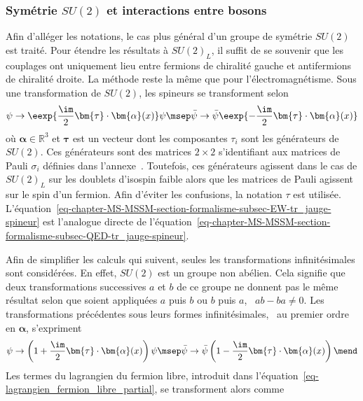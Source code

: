 \subsubsection{Symétrie $SU(2)$ et interactions entre bosons}\label{chapter-MS-MSSM-section-formalisme-subsec-EW-SU2_general}
Afin d'alléger les notations, le cas plus général d'un groupe de symétrie $SU(2)$ est traité. Pour étendre les résultats à $SU(2)_L$, il suffit de se souvenir que les couplages ont uniquement lieu entre fermions de chiralité gauche et antifermions de chiralité droite.
La méthode reste la même que pour l'électromagnétisme.
Sous une transformation de $SU(2)$, les spineurs se transforment selon
\begin{equation}
\psi \to \eexp{\frac{\im}{2}\bm{\tau}\cdot\bm{\alpha}(x)}\psi
\msep
\bar{\psi} \to \bar{\psi}\eexp{-\frac{\im}{2}\bm{\tau}\cdot\bm{\alpha}(x)}
\label{eq-chapter-MS-MSSM-section-formalisme-subsec-EW-tr_jauge-spineur}
\end{equation}
où $\bm{\alpha}\in\mathbb{R}^3$ et $\bm{\tau}$ est un vecteur dont les composantes $\tau_i$ sont les générateurs de $SU(2)$.
Ces générateurs sont des matrices $2\times2$ s'identifiant aux matrices de Pauli $\sigma_i$ définies dans l'annexe~.
Toutefois, ces générateurs agissent dans le cas de $SU(2)_L$ sur les doublets d'isospin faible alors que les matrices de Pauli agissent sur le spin d'un fermion.
Afin d'éviter les confusions, la notation $\tau$ est utilisée.
L'équation~\eqref{eq-chapter-MS-MSSM-section-formalisme-subsec-EW-tr_jauge-spineur} est l'analogue directe de l'équation~\eqref{eq-chapter-MS-MSSM-section-formalisme-subsec-QED-tr_jauge-spineur}.
\par Afin de simplifier les calculs qui suivent, seules les transformations infinitésimales sont considérées. En effet, $SU(2)$ est un groupe non abélien. Cela signifie que deux transformations successives $a$ et $b$ de ce groupe ne donnent pas le même résultat selon que soient appliquées $a$ puis $b$ ou $b$ puis $a$, \ie\ $ab-ba\neq0$.
Les transformations précédentes sous leurs formes infinitésimales, \ie\ au premier ordre en $\bm{\alpha}$, s'expriment
\begin{equation}
\psi \to \left(1+\frac{\im}{2}\bm{\tau}\cdot\bm{\alpha}(x)\right)\psi
\msep
\bar{\psi} \to \bar{\psi}\left(1-\frac{\im}{2}\bm{\tau}\cdot\bm{\alpha}(x)\right)
\mend
\end{equation}
Les termes du lagrangien du fermion libre, introduit dans l'équation~\eqref{eq-lagrangien_fermion_libre_partial}, se transforment alors comme
